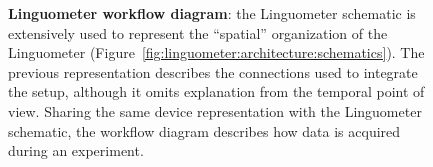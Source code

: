 \begin{figure}%
\centering
{}
	\caption[Linguometer workflow diagram]{\textbf{Linguometer workflow
	diagram}: 
	the Linguometer schematic is extensively used to represent the ``spatial'' 
	organization of the Linguometer 
	(Figure~\ref{fig:linguometer:architecture:schematics}).
	The previous representation describes the
	connections used to integrate the setup, although it omits explanation
	from the temporal point of view.
	Sharing the same device representation with the Linguometer schematic,
	the workflow diagram describes how data is acquired during an experiment.}
	\label{fig:linguometer:architecture:workflow}
\end{figure}
